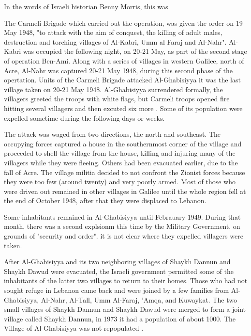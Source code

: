 In the words of Israeli historian Benny Morris, this was \cite[p.252]{Morris2004}

The Carmeli Brigade which carried out the operation, was given the order on 19 May 1948, "to attack with the aim of conquest, the killing of adult males, destruction and torching villages of Al-Kabri, Umm al Faraj and Al-Nahr"\cite[p.253]{Morris2004}. Al-Kabri was occupied the following night, on 20-21 May, as part of the second stage of operation Ben-Ami. Along with a series of villages in western Galilee, north of Acre, Al-Nahr was captured 20-21 May 1948, during this second phase of the opertation. Units of the Carmeli Brigade attacked Al-Ghabisiyya it was the last village taken on 20-21 May 1948. Al-Ghabisiyya surrendered formally, the villagers greeted the troops with white flags, but Carmeli troops opened fire hitting several villagers and then excuted six more \citep{Morris2008}. Some of its population were expelled sometime during the following days or weeks\citep{Morris2004}.

The attack was waged from two directions, the north and southeast. The occupying forces captured a house in the southernmost corner of the village and proceeded to shell the village from the house, killing and injuring many of the villagers while they were fleeing. Others had been evacuated earlier, due to the fall of Acre. The village militia decided to not confront the Zionist forces because they were too few (around twenty) and very poorly armed. Most of those who were driven out remained in other villages in Galilee until the whole region fell at the end of October 1948, after that they were displaced to Lebanon\citep{Khalidi2015}.

Some inhabitants remained in Al-Ghabisiyya until Febrauary 1949. During that month, there was a second explsionm this time by the Military Government, on grounds of "security and order". it is not clear where they expelled villagers were taken\citep{Morris2004}.

After Al-Ghabisiyya and its two neighboring villages of Shaykh Dannun and Shaykh Dawud were evacuated, the Israeli government permitted some of the inhabitants of the latter two villages to return to their homes. Those who had not sought refuge in Lebanon came back and were joined by a few families from Al-Ghabisiyya, Al-Nahr, Al-Tall, Umm Al-Faraj, 'Amqa, and Kuwaykat. The two small villages of Shaykh Dannun and Shaykh Dawud were merged to form a joint village called Shaykh Dannun, in 1973 it had a population of about 1000. The Village of Al-Ghabisiyya was not repopulated \citep{Khalidi2015}.  

